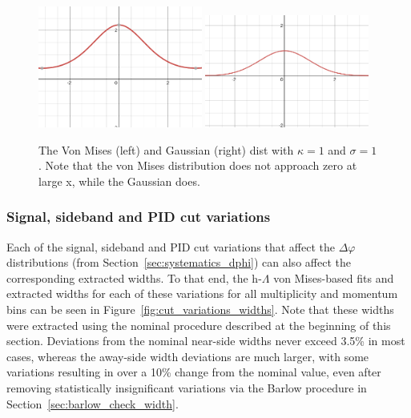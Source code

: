 \begin{figure}[ht]
    \centering
    \includegraphics[width=0.48\textwidth]{figures/analysis/von_plot.png}
    \includegraphics[width=0.48\textwidth]{figures/analysis/gaussian_plot.png}
    \caption{The Von Mises (left) and Gaussian (right) dist with $\kappa = 1$ and $\sigma = 1$. Note that the von Mises distribution does not approach zero at large x, while the Gaussian does.}
    \label{fig:von_mises_vs_gaus}
\end{figure}

\subsubsection{Signal, sideband and PID cut variations}
\label{sec:cut_systematics_width}

Each of the signal, sideband and PID cut variations that affect the $\Delta\varphi$ distributions (from Section~\ref{sec:systematics_dphi}) can also affect the corresponding extracted widths. To that end, the h-$\Lambda$ \dphi von Mises-based fits and extracted widths for each of these variations for all multiplicity and momentum bins can be seen in Figure~\ref{fig:cut_variations_widths}. Note that these widths were extracted using the nominal procedure described at the beginning of this section. Deviations from the nominal near-side widths never exceed 3.5\% in most cases, whereas the away-side width deviations are much larger, with some variations resulting in over a 10\% change from the nominal value, even after removing statistically insignificant variations via the Barlow procedure in Section~\ref{sec:barlow_check_width}. 

